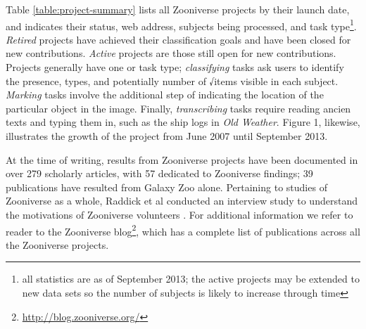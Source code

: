 \documentclass{sigchi}
\begin{document}

Table \ref{table:project-summary} lists all Zooniverse projects by their launch date, and indicates their status, web address, subjects being processed, and task type\footnote{all statistics are as of September 2013; the active projects may be extended to new data sets so the number of subjects is likely to increase through time}. \emph{Retired} projects have achieved their classification goals and have been closed for new contributions. \emph{Active} projects are those still open for new contributions.  Projects generally have one or task type; \emph{classifying} tasks ask users to identify the presence, types, and potentially number of √items visible in each subject.  \emph{Marking} tasks involve the additional step of indicating the location of the particular object in the image.  Finally, \emph{transcribing} tasks require reading ancien texts and typing them in, such as the ship logs in \emph{Old Weather}. Figure 1, likewise, illustrates the growth of the project from June 2007 until September 2013.  

At the time of writing, results from Zooniverse projects have been documented in over 279 scholarly articles, with 57  dedicated to Zooniverse findings; 39 publications have resulted from Galaxy Zoo alone.  Pertaining to studies of Zooniverse as a whole, Raddick et al conducted an interview study to understand the motivations of Zooniverse volunteers \cite{raddick2010galaxy}. For additional information we refer to reader to the Zooniverse blog\footnote{\url{http://blog.zooniverse.org/}}, which has a complete list of publications across all the Zooniverse projects.
\end{document}
